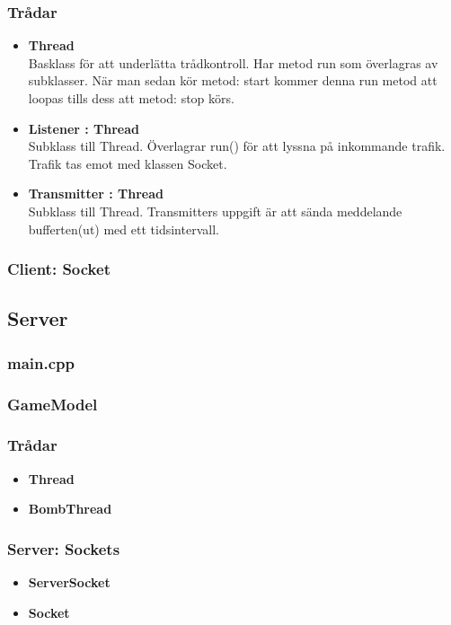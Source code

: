 \documentclass[10pt, titlepage, oneside, a4paper]{article}
\begin{document}
    		\subsubsection{Trådar}
    		\begin{itemize}
    			\item\textbf{Thread}\\Basklass för att underlätta trådkontroll. Har metod run som överlagras av subklasser. När man sedan kör metod: start kommer denna run metod att loopas tills dess att metod: stop körs.
    			
    			\item\textbf{Listener : Thread}\\Subklass till Thread. Överlagrar run() för att lyssna på inkommande trafik. Trafik tas emot med klassen Socket. 
    			\item\textbf{Transmitter : Thread}\\Subklass till Thread. Transmitters uppgift är att sända meddelande bufferten(ut) med ett tidsintervall. 
    		\end{itemize}
    		\subsubsection{Client: Socket}
    		
    	\subsection{Server}
    		\subsubsection{main.cpp}
    		\subsubsection{GameModel}
    		\subsubsection{Trådar}
    		\begin{itemize}
    			\item\textbf{Thread}
    			\item\textbf{BombThread}
    		\end{itemize}
    		\subsubsection{Server: Sockets}
    		\begin{itemize}
    			\item\textbf{ServerSocket}
    			\item\textbf{Socket}
    		\end{itemize}
    		
\end{document}
